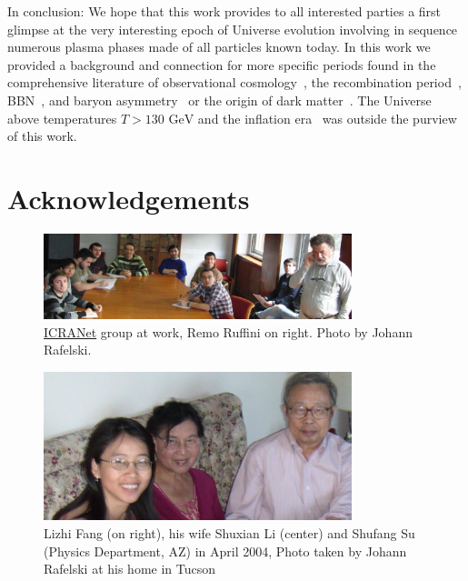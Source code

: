 \documentclass[universe,article,submit,moreauthors,pdftex,a4paper]{Definitions/mdpi}
\newcommand{\GeV}{\text{ GeV}}
\begin{document}
In conclusion: We hope that this work provides to all interested parties a first glimpse at the very interesting epoch of Universe evolution involving in sequence numerous plasma phases made of all particles known today. In this work we provided a background and connection for more specific periods found in the comprehensive literature of observational cosmology~\cite{Davis:1985rj,Navarro:1995iw,Moore:1999nt,Springel:2005nw,Demianski:2015xye,Arbey:2021gdg}, the recombination period~\cite{Planck:2018vyg,Planck:2018nkj}, BBN~\cite{Steigman:2007xt,Cyburt:2015mya,Pitrou:2018cgg}, and baryon asymmetry~\cite{Kuzmin:1985mm,Canetti:2012zc,ParticleDataGroup:2022pth} or the origin of dark matter~\cite{Bertone:2004pz,Peccei:2006as,Wantz:2009it}. The Universe above temperatures $T>130 \GeV$ and the inflation era~\cite{Baumann:2009ds,Allahverdi:2020bys} was outside the purview of this work.

\section*{Acknowledgements}

\begin{figure}[ht]
    \centering \includegraphics[width=0.8\textwidth]{./plots/12MarchRemoAtWorkC.jpg}
    \caption{\href{https://www.icranet.org/}{ICRANet} group at work, Remo Ruffini on right. Photo by Johann Rafelski. \label{RemoAtWork}}
\end{figure}

\begin{figure}[ht]
\centering
\includegraphics[width=0.8\textwidth]{./plots/04April14ShuFangC.JPG}
\caption{Lizhi Fang (on right), his wife Shuxian Li (center) and Shufang Su (Physics Department, AZ) in April 2004, Photo taken by Johann Rafelski at his home in Tucson}
\label{JRhomeFang}
\end{figure}
\end{document}
